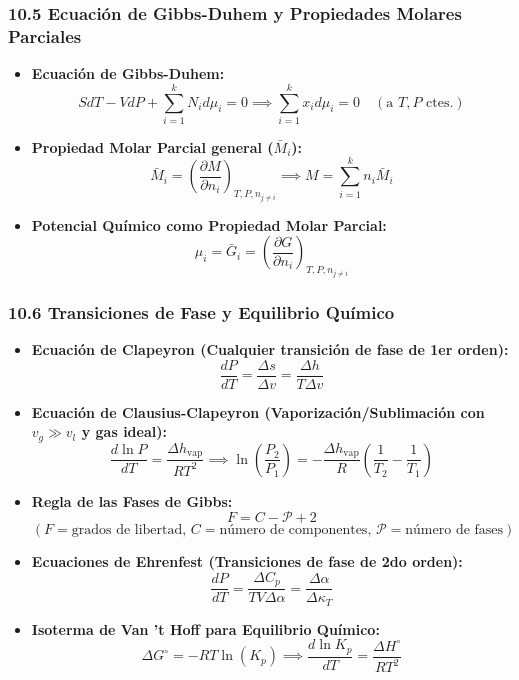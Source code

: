 \documentclass[11pt,a4paper]{article}
\begin{document}
\subsubsection*{10.5 Ecuación de Gibbs-Duhem y Propiedades Molares Parciales}

\begin{itemize}
  \item \textbf{Ecuación de Gibbs-Duhem:}
  \[
    S dT - V dP + \sum_{i=1}^k N_i d\mu_i = 0 \implies \sum_{i=1}^k x_i d\mu_i = 0 \quad (\text{a } T, P \text{ ctes.})
  \]
  \item \textbf{Propiedad Molar Parcial general ($\bar{M}_i$):}
  \[
    \bar{M}_i = \left( \frac{\partial M}{\partial n_i} \right)_{T, P, n_{j \neq i}} \implies M = \sum_{i=1}^k n_i \bar{M}_i
  \]
  \item \textbf{Potencial Químico como Propiedad Molar Parcial:}
  \[
    \mu_i = \bar{G}_i = \left( \frac{\partial G}{\partial n_i} \right)_{T, P, n_{j \neq i}}
  \]
\end{itemize}

\subsubsection*{10.6 Transiciones de Fase y Equilibrio Químico}

\begin{itemize}
  \item \textbf{Ecuación de Clapeyron (Cualquier transición de fase de 1er orden):}
  \[
    \frac{dP}{dT} = \frac{\Delta s}{\Delta v} = \frac{\Delta h}{T \Delta v}
  \]
  \item \textbf{Ecuación de Clausius-Clapeyron (Vaporización/Sublimación con $v_g \gg v_l$ y gas ideal):}
  \[
    \frac{d \ln P}{dT} = \frac{\Delta h_{\text{vap}}}{R T^2} \implies \ln\left( \frac{P_2}{P_1} \right) = -\frac{\Delta h_{\text{vap}}}{R} \left( \frac{1}{T_2} - \frac{1}{T_1} \right)
  \]
  \item \textbf{Regla de las Fases de Gibbs:}
  \[
    F = C - \mathcal{P} + 2
  \]
  \[
    (F = \text{grados de libertad}, \, C = \text{número de componentes}, \, \mathcal{P} = \text{número de fases})
  \]
  \item \textbf{Ecuaciones de Ehrenfest (Transiciones de fase de 2do orden):}
  \[
    \frac{dP}{dT} = \frac{\Delta C_p}{T V \Delta \alpha} = \frac{\Delta \alpha}{\Delta \kappa_T}
  \]
  \item \textbf{Isoterma de Van 't Hoff para Equilibrio Químico:}
  \[
    \Delta G^\circ = -R T \ln(K_p) \implies \frac{d \ln K_p}{dT} = \frac{\Delta H^\circ}{R T^2}
  \]
\end{itemize}
\end{document}
